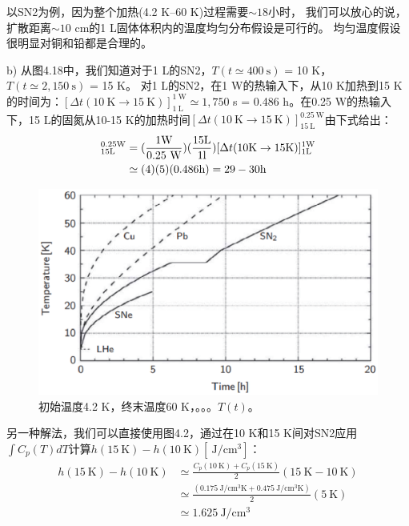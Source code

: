 以SN2为例，因为整个加热(4.2 K–60 K)过程需要$\sim 18$小时，
我们可以放心的说，扩散距离$\sim 10$ cm的1 L固体体积内的温度均匀分布假设是可行的。
均匀温度假设很明显对铜和铅都是合理的。

b) 从图4.18中，我们知道对于1 L的SN2，$T(t\simeq 400\ \mathrm{s})$ = 10 K，$T(t\simeq 2,150\ \mathrm{s})$ = 15 K。
对1 L的SN2，在1 W的热输入下，从10 K加热到15 K的时间为：$[\Delta t(10 \ \mathrm{K}\rightarrow 15\ \mathrm{K})]_{1\ \mathrm{L}}^{1\ \mathrm{W}}\simeq 1,750$ s = 0.486 h。在0.25 W的热输入下，15 L的固氮从10-15 K的加热时间$[\Delta t(10 \ \mathrm{K}\rightarrow 15 \ \mathrm{K})]_{15 \ \mathrm{L}}^{0.25\ \mathrm{W}}$由下式给出：
\begin{align*}%
[\Delta t(10\mathrm{K}\rightarrow 15\ \mathrm{K})]_{15\mathrm{L}}^{0.25\mathrm{W}}&=(\frac{1\mathrm{W}}{0.25\ \mathrm{W}})(\frac{15\mathrm{L}}{1\mathrm{l}})[\Delta t(10\mathrm{K}\rightarrow 15\mathrm{K})]_{1\mathrm{L}}^{1\mathrm{W}}\\\notag
&\simeq (4)(5)(0.486\mathrm{h})=29-30\mathrm{h}
\end{align*}

\begin{figure}[htbp]
	\centering
	\includegraphics[scale=0.6]{chpt4/figs/fig4.18.eps}
	\caption{初始温度4.2 K，终末温度60 K，。。。$T(t)$。}
\end{figure}

另一种解法，我们可以直接使用图4.2，通过在10 K和15 K间对SN2应用$\int C_p(T)dT$计算$h(15\ \mathrm{K})−h(10\ \mathrm{K}) [\ \mathrm{J/cm^3}]$：
\begin{align*}%
h(15\ \mathrm{K})-h(10\ \mathrm{K})&\simeq\frac{C_p(10\ \mathrm{K})+C_p(15\ \mathrm{K})}{2}(15\ \mathrm{K}-10\ \mathrm{K})\\
&\simeq\frac{(0.175\ \mathrm{J/cm^3K}+0.475\ \mathrm{J/cm^3K} )}{2}(5\ \mathrm{K})\\
&\simeq 1.625\ \mathrm{J/cm^3}
\end{align*}

